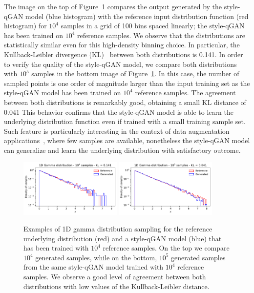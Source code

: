 \documentclass[twocolumn,preprintnumbers,superscriptaddress]{revtex4-2}
\begin{document}
The image on the top of Figure~\ref{fig:gamma} compares the output generated by
the style-qGAN model (blue histogram) with the reference input distribution
function (red histogram) for $10^4$ samples in a grid of 100 bins spaced
linearly; the style-qGAN has been trained on $10^4$ reference samples. We observe that the distributions are statistically similar even for
this high-density binning choice. In particular, the Kullback-Leibler
divergence (KL)~\cite{kullback1951information} between both distributions is
0.141.
%
In order to verify the quality of the style-qGAN model, we compare both distributions
with $10^5$ samples in the bottom image of Figure~\ref{fig:gamma}. In this case,
the number of sampled points is one order of magnitude larger than the input
training set as the style-qGAN model has been trained on $10^4$ reference samples. The agreement between both distributions is remarkably good,
obtaining a small KL distance of 0.041
%
This behavior confirms that the style-qGAN model is able to learn the underlying
distribution function even if trained with a small training sample set. Such
feature is particularly interesting in the context of data augmentation
applications~\cite{frid2018synthetic,tanaka2019data}, where few samples are
available, nonetheless the style-qGAN model can generalize and learn the underlying distribution
with satisfactory outcome.

\begin{figure}
  \includegraphics[width=0.45\textwidth]{plots/1Dgamma/1Dgamma_distribution_10k.pdf}
  \includegraphics[width=0.45\textwidth]{plots/1Dgamma/1Dgamma_distribution_100k.pdf}
  \caption{\label{fig:gamma} Examples of 1D gamma distribution sampling for the
  reference underlying distribution (red) and a style-qGAN model (blue) that has been
  trained with $10^4$ reference samples. On the top we compare $10^4$ generated samples, while
  on the bottom, $10^5$ generated samples from the same style-qGAN model
  trained with $10^4$ reference samples. We observe a good level of agreement between both
  distributions with low values of the Kullback-Leibler distance.}
\end{figure}
\end{document}
